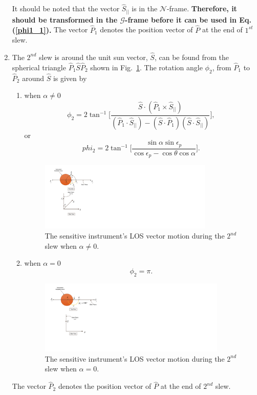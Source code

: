 \documentclass[journal ]{new-aiaa}
\begin{document}
\begin{enumerate}
		It should be noted that the vector $\hat{S}_{||}$ is in the $\mathcal{N}$-frame. \textbf{Therefore, it should be transformed in the $\mathcal{G}$-frame before it can be used in Eq. (\ref{phi1_1}).} The vector $\hat{P}_1$ denotes the position vector of $\hat{P}$ at the end of $1^{st}$ slew.
		\item The $2^{nd}$ slew is around the unit sun vector, $\hat{S}$, can be found from the spherical triangle $\hat{P}_1\hat{S}\hat{P}_2$ shown in Fig.~\ref{sphericaltriangle}. The rotation angle $\phi_2$, from $\hat{P}_1$ to $\hat{P}_2$ around $\hat{S}$ is given by\cite{Wertz2011} 
		\begin{enumerate}
			\item when $\alpha\neq 0$
	\begin{equation}
	\phi_2=2\tan^{-1}\Big[ \frac{\hat{S}\cdot (\hat{P}_1\times\hat{S}_{||})}{(\hat{P}_1\cdot\hat{S}_{||})-(\hat{S}\cdot\hat{P}_1)(\hat{S}\cdot\hat{S}_{||})}\Big], 
	\end{equation}
or
	\begin{equation} 
	phi_2=2\tan^{-1}\Big[ \frac{\sin\alpha \sin\epsilon_p}{\cos\epsilon_p-\cos\theta\cos\alpha}\Big].
	\end{equation}
			\begin{figure}[h!]
				\centering
					\includegraphics[width=3.25in]{./Figures/SVAS_2r_modified}
					\caption{The sensitive instrument's LOS vector motion during the $2^{nd}$ slew when $\alpha\neq 0$.}
					\label{sphericaltriangle}
			\end{figure}			
			\item when $\alpha=0$
			\begin{equation}
				\phi_2 = \pi.
			\end{equation}
			\begin{figure}[h!]
				\centering
					\includegraphics[width=3.5in]{./Figures/SVAS_3r_modified}
						\caption{The sensitive instrument's LOS vector motion during the $2^{nd}$ slew when $\alpha= 0$.}
			\end{figure}
		\end{enumerate}
		The vector $\hat{P}_2$ denotes the position vector of $\hat{P}$ at the end of $2^{nd}$ slew.
		

\end{enumerate}
\end{document}

